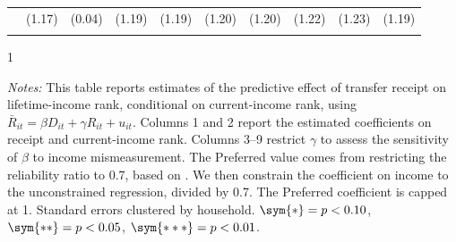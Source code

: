 \begin{table}[]
\begin{tabular*}{1.36\textwidth}{@{\extracolsep{\fill}}lccccccccc}
                   & (1.17)          & (0.04)          & (1.19)          & (1.19)          & (1.20)          & (1.20)          & (1.22)          & (1.23)          & (1.19)     \\
\addlinespace
\bottomrule
\end{tabular*}
\begin{spacing}{1}
\begin{tablenotes}
\item \footnotesize \textit{Notes:} This table reports estimates of
  the predictive effect of transfer receipt on lifetime-income rank,
  conditional on current-income rank, using $\bar{R}_{it}=\beta
  D_{it}+\gamma R_{it}+u_{it}$. Columns 1 and 2 report the estimated
  coefficients on receipt and current-income rank. Columns 3--9
  restrict $\gamma$ to assess the
  sensitivity of $\beta$ to income mismeasurement. The Preferred value
  comes from restricting the reliability ratio to 0.7, based on \citet{abowd2013estimating}. We then
  constrain the coefficient on income to the unconstrained regression,
  divided by 0.7. The Preferred coefficient is capped at 1. Standard errors clustered by household. $\sym{*}=p<0.10$, $\sym{**}=p<0.05$, $\sym{***}=p<0.01$.
\end{tablenotes}
\end{spacing}
\end{table}

